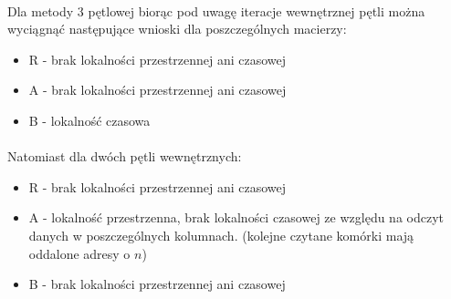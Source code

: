 \documentclass{scrartcl}
\begin{document}
\paragraph{}
Dla metody 3 pętlowej biorąc pod uwagę iteracje wewnętrznej pętli można wyciągnąć następujące wnioski dla poszczególnych macierzy: \\
\begin{itemize}
\item R - brak lokalności przestrzennej ani czasowej
\item A - brak lokalności przestrzennej ani czasowej
\item B - lokalność czasowa
\end{itemize}
\paragraph{}Natomiast dla dwóch pętli wewnętrznych:
\begin{itemize}
\item R - brak lokalności przestrzennej ani czasowej
\item A - lokalność przestrzenna, brak lokalności czasowej ze względu na odczyt danych w poszczególnych kolumnach. (kolejne czytane komórki mają oddalone adresy o $n$)
\item B - brak lokalności przestrzennej ani czasowej
\end{itemize}
\end{document}
